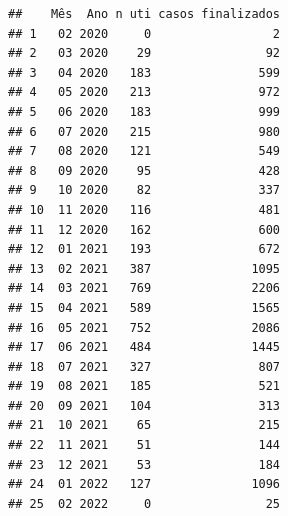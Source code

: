 \documentclass[
]{article}
\begin{document}
\begin{verbatim}
##    Mês  Ano n uti casos finalizados
## 1   02 2020     0                 2
## 2   03 2020    29                92
## 3   04 2020   183               599
## 4   05 2020   213               972
## 5   06 2020   183               999
## 6   07 2020   215               980
## 7   08 2020   121               549
## 8   09 2020    95               428
## 9   10 2020    82               337
## 10  11 2020   116               481
## 11  12 2020   162               600
## 12  01 2021   193               672
## 13  02 2021   387              1095
## 14  03 2021   769              2206
## 15  04 2021   589              1565
## 16  05 2021   752              2086
## 17  06 2021   484              1445
## 18  07 2021   327               807
## 19  08 2021   185               521
## 20  09 2021   104               313
## 21  10 2021    65               215
## 22  11 2021    51               144
## 23  12 2021    53               184
## 24  01 2022   127              1096
## 25  02 2022     0                25
\end{verbatim}
\end{document}
